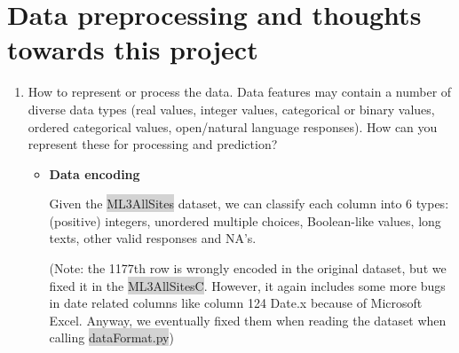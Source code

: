 \documentclass[11pt, a4paper]{article}
\begin{document}
\section{Data preprocessing and thoughts towards this project}
\label{sec:Prerequisites}
\begin{enumerate}
	\item {How to represent or process the data. Data features may contain a number of diverse data types (real values, integer values, categorical or binary values, ordered categorical values, open/natural language responses). How can you represent these for processing and prediction?}
	\begin{itemize}
		\item {\textbf{Data encoding}}
		\par{Given the \colorbox{lightgray}{ML3AllSites} dataset, we can classify each column into 6 types: (positive) integers, unordered multiple choices, Boolean-like values, long texts, other valid responses and NA's.
			
			(Note: the 1177th row is wrongly encoded in the original dataset, but we fixed it in the \colorbox{lightgray}{ML3AllSitesC}. However, it again includes some more bugs in date related columns like column 124 Date.x because of Microsoft Excel. Anyway, we eventually fixed them when reading the dataset when calling \colorbox{lightgray}{dataFormat.py})
			
}
\end{itemize}
\end{enumerate}
\end{document}
